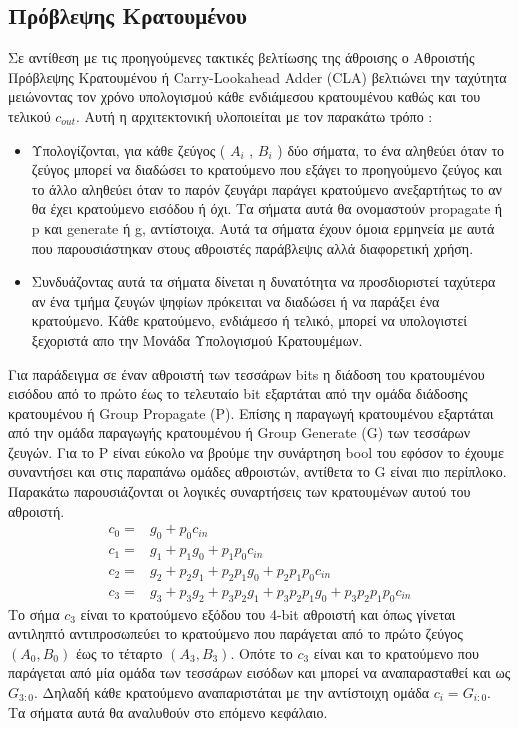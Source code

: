 \subsection{Πρόβλεψης Κρατουμένου}
Σε αντίθεση με τις προηγούμενες τακτικές βελτίωσης της άθροισης ο Αθροιστής Πρόβλεψης Κρατουμένου ή Carry-Lookahead Adder (CLA) βελτιώνει την ταχύτητα μειώνοντας τον χρόνο υπολογισμού κάθε ενδιάμεσου κρατουμένου καθώς και του τελικού $c_{out}$.
Αυτή η αρχιτεκτονική υλοποιείται με τον παρακάτω τρόπο :
\begin{itemize}
    \item Υπολογίζονται, για κάθε ζεύγος ( $A_i$ , $B_i$ ) δύο σήματα, το ένα αληθεύει 
    όταν το ζεύγος μπορεί να διαδώσει το κρατούμενο που εξάγει το προηγούμενο ζεύγος 
    και το άλλο αληθεύει όταν το παρόν ζευγάρι παράγει κρατούμενο ανεξαρτήτως το 
    αν θα έχει κρατούμενο εισόδου ή όχι. Τα σήματα αυτά θα ονομαστούν propagate ή p
    και generate ή g, αντίστοιχα. Αυτά τα σήματα έχουν όμοια ερμηνεία με αυτά που παρουσιάστηκαν στους αθροιστές παράβλεψις αλλά διαφορετική χρήση.
    \item Συνδυάζοντας αυτά τα σήματα δίνεται η δυνατότητα να προσδιοριστεί ταχύτερα αν ένα τμήμα ζευγών ψηφίων πρόκειται να διαδώσει ή να παράξει ένα κρατούμενο. Κάθε κρατούμενο, ενδιάμεσο ή τελικό, μπορεί να υπολογιστεί ξεχοριστά απο την Μονάδα Υπολογισμού Κρατουμέμων.
\end{itemize}


Για παράδειγμα σε έναν αθροιστή των τεσσάρων bits η διάδοση του κρατουμένου εισόδου από το πρώτο έως το τελευταίο bit εξαρτάται από την ομάδα διάδοσης κρατουμένου ή Group Propagate (P). Επίσης η παραγωγή κρατουμένου εξαρτάται από την ομάδα παραγωγής κρατουμένου ή Group Generate (G) των τεσσάρων ζευγών. Για το P είναι εύκολο να βρούμε την συνάρτηση bool του εφόσον το έχουμε συναντήσει και στις παραπάνω ομάδες αθροιστών, αντίθετα το G είναι πιο περίπλοκο. Παρακάτω παρουσιάζονται οι λογικές συναρτήσεις των κρατουμένων αυτού του αθροιστή.
\begin{equation}
    \begin{split}
        c_0 =& g_0 + p_0c_{in}\\
        c_1 =& g_1 + p_1g_0 + p_1p_0c_{in}\\
        c_2 =& g_2 + p_2g_1 + p_2p_1g_0 + p_2p_1p_0c_{in}\\
        c_3 =& g_3 + p_3g_2 + p_3p_2g_1 + p_3p_2p_1g_0 + p_3p_2p_1p_0c_{in}
    \end{split}
    \label{eq:cla_carries_4bit}
\end{equation}
Το σήμα $c_3$ είναι το κρατούμενο εξόδου του 4-bit αθροιστή και όπως γίνεται αντιληπτό αντιπροσωπεύει το κρατούμενο που παράγεται από το πρώτο ζεύγος $(Α_0,Β_0)$ έως το τέταρτο $(A_3,B_3)$. Οπότε το $c_3$ είναι και το κρατούμενο που παράγεται από μία ομάδα των τεσσάρων εισόδων και μπορεί να αναπαρασταθεί και ως $G_{3:0}$. Δηλαδή κάθε κρατούμενο αναπαριστάται με την αντίστοιχη ομάδα $c_i = G_{i:0}$. Τα σήματα αυτά θα αναλυθούν στο επόμενο κεφάλαιο.

